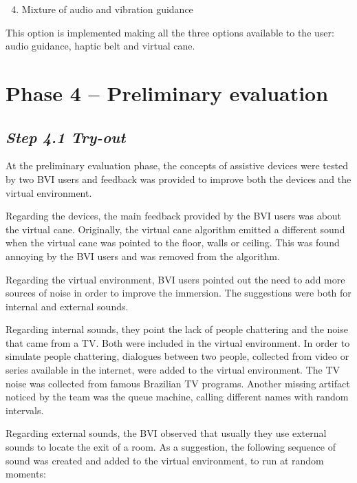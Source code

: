         \begin{enumerate} [label = \Alph*)]
            \setcounter{enumi}{3}
            \item Mixture of audio and vibration guidance
        \end{enumerate}

        This option is implemented making all the three options available to the user: audio guidance, haptic belt and virtual cane. 


\section{Phase 4 – Preliminary evaluation}
\label{sec:tests_phase}
        
\subsection*{\textit{Step 4.1 Try-out}}

        At the preliminary evaluation phase, the concepts of assistive devices were tested by two BVI users and feedback was provided to improve both the devices and the virtual environment. 

        Regarding the devices, the main feedback provided by the BVI users was about the virtual cane. Originally, the virtual cane algorithm emitted a different sound when the virtual cane was pointed to the floor, walls or ceiling. This was found annoying by the BVI users and was removed from the algorithm.

        Regarding the virtual environment, BVI users pointed out the need to add more sources of noise in order to improve the immersion. The suggestions were both for internal and external sounds.
        
        Regarding internal sounds, they point the lack of people chattering and the noise that came from a TV. Both were included in the virtual environment. In order to simulate people chattering, dialogues between two people, collected from video or series available in the internet, were added to the virtual environment. The TV noise was collected from famous Brazilian TV programs. Another missing artifact noticed by the team was the queue machine, calling different names with random intervals. 

        Regarding external sounds, the BVI observed that usually they use external sounds to locate the exit of a room. As a suggestion, the following sequence of sound was created and added to the virtual environment, to run at random moments:

